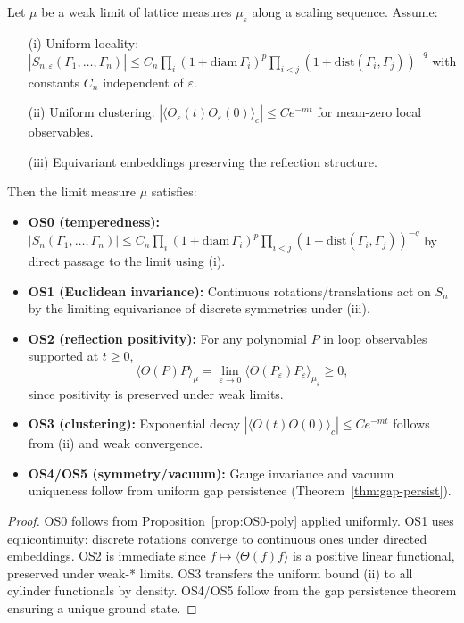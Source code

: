 \documentclass[11pt]{amsart}
\begin{document}
\begin{lemma}\label{lem:os-continuum}
Let $\mu$ be a weak limit of lattice measures $\mu_\varepsilon$ along a scaling sequence. Assume:
\begin{itemize}
  \item[(i)] Uniform locality: $|S_{n,\varepsilon}(\Gamma_1,\ldots,\Gamma_n)| \le C_n \prod_i (1+\text{diam}\,\Gamma_i)^p \prod_{i<j} (1+\text{dist}(\Gamma_i,\Gamma_j))^{-q}$ with constants $C_n$ independent of $\varepsilon$.
  \item[(ii)] Uniform clustering: $|\langle O_\varepsilon(t) O_\varepsilon(0) \rangle_c| \le C e^{-m t}$ for mean-zero local observables.
  \item[(iii)] Equivariant embeddings preserving the reflection structure.
\end{itemize}
Then the limit measure $\mu$ satisfies:
\begin{itemize}
  \item \textbf{OS0 (temperedness):} $|S_n(\Gamma_1,\ldots,\Gamma_n)| \le C_n \prod_i (1+\text{diam}\,\Gamma_i)^p \prod_{i<j} (1+\text{dist}(\Gamma_i,\Gamma_j))^{-q}$ by direct passage to the limit using (i).
  \item \textbf{OS1 (Euclidean invariance):} Continuous rotations/translations act on $S_n$ by the limiting equivariance of discrete symmetries under (iii).
  \item \textbf{OS2 (reflection positivity):} For any polynomial $P$ in loop observables supported at $t \ge 0$,
  \[
    \langle \Theta(P) P \rangle_\mu = \lim_{\varepsilon \to 0} \langle \Theta(P_\varepsilon) P_\varepsilon \rangle_{\mu_\varepsilon} \ge 0,
  \]
  since positivity is preserved under weak limits.
  \item \textbf{OS3 (clustering):} Exponential decay $|\langle O(t) O(0) \rangle_c| \le C e^{-mt}$ follows from (ii) and weak convergence.
  \item \textbf{OS4/OS5 (symmetry/vacuum):} Gauge invariance and vacuum uniqueness follow from uniform gap persistence (Theorem~\ref{thm:gap-persist}).
\end{itemize}
\end{lemma}

\begin{proof}
OS0 follows from Proposition~\ref{prop:OS0-poly} applied uniformly. OS1 uses equicontinuity: discrete rotations converge to continuous ones under directed embeddings. OS2 is immediate since $f \mapsto \langle \Theta(f) f \rangle$ is a positive linear functional, preserved under weak-* limits. OS3 transfers the uniform bound (ii) to all cylinder functionals by density. OS4/OS5 follow from the gap persistence theorem ensuring a unique ground state.
\end{proof}
\end{document}

